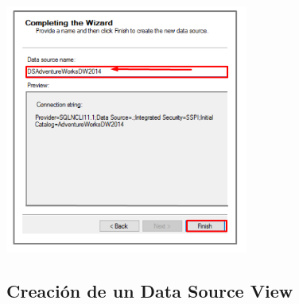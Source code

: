 \begin{itemize}
\begin{center}
	\includegraphics[width=8cm]{./Imagenes/img8}
    \end{center}	


\subsection{Creación de un Data Source View}


\end{itemize}
